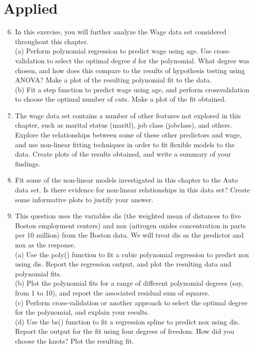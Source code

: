 \documentclass[10pt]{article}
\begin{document}
\section*{Applied}
\begin{enumerate}
  \setcounter{enumi}{5}
  \item In this exercise, you will further analyze the Wage data set considered throughout this chapter.\\
(a) Perform polynomial regression to predict wage using age. Use cross-validation to select the optimal degree $d$ for the polynomial. What degree was chosen, and how does this compare to the results of hypothesis testing using ANOVA? Make a plot of the resulting polynomial fit to the data.\\
(b) Fit a step function to predict wage using age, and perform crossvalidation to choose the optimal number of cuts. Make a plot of the fit obtained.
  \item The wage data set contains a number of other features not explored in this chapter, such as marital status (maritl), job class (jobclass), and others. Explore the relationships between some of these other predictors and wage, and use non-linear fitting techniques in order to fit flexible models to the data. Create plots of the results obtained, and write a summary of your findings.
  \item Fit some of the non-linear models investigated in this chapter to the Auto data set. Is there evidence for non-linear relationships in this data set? Create some informative plots to justify your answer.
  \item This question uses the variables dis (the weighted mean of distances to five Boston employment centers) and nox (nitrogen oxides concentration in parts per 10 million) from the Boston data. We will treat dis as the predictor and nox as the response.\\
(a) Use the poly() function to fit a cubic polynomial regression to predict nox using dis. Report the regression output, and plot the resulting data and polynomial fits.\\
(b) Plot the polynomial fits for a range of different polynomial degrees (say, from 1 to 10), and report the associated residual sum of squares.\\
(c) Perform cross-validation or another approach to select the optimal degree for the polynomial, and explain your results.\\
(d) Use the bs() function to fit a regression spline to predict nox using dis. Report the output for the fit using four degrees of freedom. How did you choose the knots? Plot the resulting fit.\\

\end{enumerate}
\end{document}
